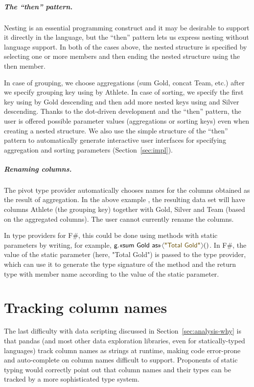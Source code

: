 \documentclass[a4paper,UKenglish]{lipics-v2016}
\theoremstyle{plain}
\theoremstyle{definition}
\newcommand{\langl}{\begin{picture}(4.5,7)
\put(1.1,2.5){\rotatebox{60}{\line(1,0){5.5}}}
\put(1.1,2.5){\rotatebox{300}{\line(1,0){5.5}}}
\end{picture}}
\newcommand{\rangl}{\begin{picture}(4.5,7)
\put(.9,2.5){\rotatebox{120}{\line(1,0){5.5}}}
\put(.9,2.5){\rotatebox{240}{\line(1,0){5.5}}}
\end{picture}}
\newcommand{\ball}[1]{\FPeval{\result}{clip(201+#1)}\textnormal{\ding{\result}}}
\newcommand{\str}[1]{\textnormal{\textcolor{strclr}{\sffamily "#1"}}}
\newcommand{\ident}[1]{\textnormal{\sffamily #1}}
\newcommand{\qident}[1]{\textnormal{\sffamily \guillemotleft #1\guillemotright}}
\begin{document}
\subparagraph{The ``then'' pattern.}
Nesting is an essential programming construct and it may be desirable to support it directly in 
the language, but the ``then'' pattern lets us express nesting without language support. In both 
of the cases above, the nested structure is specified by selecting one or more members and then 
ending the nested structure using the \ident{then} member.

In case of grouping, we choose aggregations (\qident{sum Gold}, \qident{concat Team}, etc.) after 
we specify grouping key using \qident{by Athlete}. In case of sorting, we specify the first key
using \qident{by Gold descending} and then add more nested keys using \qident{and Silver descending}.
Thanks to the dot-driven development and the ``then'' pattern, the user is offered possible 
parameter values (aggregations or sorting keys) even when creating a nested structure. We also use
the simple structure of the ``then'' pattern to automatically generate interactive user
interfaces for specifying aggregation and sorting parameters (Section~\ref{sec:impl}).

\subparagraph{Renaming columns.}
The pivot type provider automatically chooses names for the columns obtained as the result of
aggregation. In the above example \ball{1}, the resulting data set will have columns Athlete
(the grouping key) together with Gold, Silver and Team (based on the aggregated columns).
The user cannot currently rename the columns.

In type providers for F\#, this could be done using methods with static parameters \cite{staticpar} by writing, 
for example, $\ident{g}.\qident{sum Gold as}\langl\str{Total Gold}\rangl()$. In F\#, the value of 
the static parameter (here, \str{Total Gold}) is passed to the type provider, which can use it to
generate the type signature of the method and the return type with member name according to the
value of the static parameter.


\section{Tracking column names}
\label{sec:columns}

The last difficulty with data scripting discussed in Section~\ref{sec:analysis-why} is that pandas 
(and most other data exploration libraries, even for statically-typed languages) track column names as 
strings at runtime, making code error-prone and auto-complete on column names difficult to support.
Proponents of static typing would correctly point out that column names and their types can be
tracked by a more sophisticated type system. 
\end{document}
